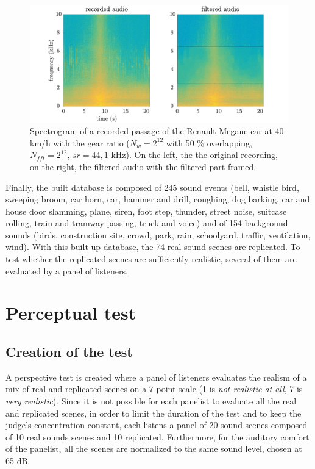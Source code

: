 \documentclass[a4,11pt,twocolumn]{article}
\begin{document}
\begin{figure}[hbtp]
\centering
\includegraphics[width=\linewidth]{./pictures/filtrageMedian_VL1_R3_40_EN.pdf}
\caption{Spectrogram of a recorded passage of the Renault Megane car at 40 km/h with the  gear ratio ($N_{w} = 2^{12}$ with 50 $\%$ overlapping, $N_{fft} = 2^{12}$, $sr = 44,1$ kHz). On the left, the the original recording, on the right, the filtered audio with the filtered part framed.}
\label{fig:filtre_car}
\end{figure}

Finally, the built database is composed of 245 sound events (bell, whistle bird, sweeping broom, car horn, car, hammer and drill, coughing, dog barking, car and house door slamming, plane, siren, foot step, thunder, street noise, suitcase rolling, train and tramway passing, truck and voice) and of 154 background sounds (birds, construction site, crowd, park, rain, schoolyard, traffic, ventilation, wind). With this built-up database, the 74 real sound scenes are replicated. To test whether the replicated scenes are sufficiently realistic, several of them are evaluated by a panel of listeners.

\section{Perceptual test} \label{sec:test}
\subsection{Creation of the test}
A perspective test is created where a panel of listeners evaluates the realism of a mix of real and replicated scenes on a 7-point scale (1 is \textit{not realistic at all}, 7 is \textit{very realistic}). Since it is not possible for each panelist to evaluate all the real and replicated scenes, in order to limit the duration of the test and to keep the judge's concentration constant, each listens a panel of 20 sound scenes composed of 10 real sounds scenes and 10 replicated. Furthermore, for the auditory comfort of the panelist, all the scenes are normalized to the same sound level, chosen at 65 dB.\\
\end{document}
